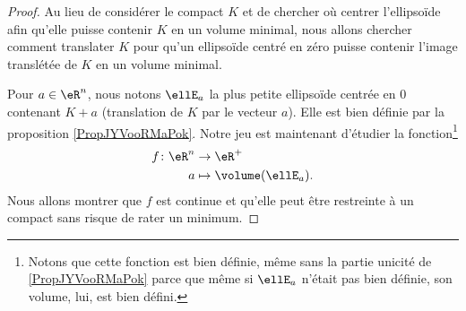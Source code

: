 \begin{proof}
    Au lieu de considérer le compact \( K\) et de chercher où centrer l'ellipsoïde afin qu'elle puisse contenir \( K\) en un volume minimal, nous allons chercher comment translater \( K\) pour qu'un ellipsoïde centré en zéro puisse contenir l'image translétée de \( K \) en un volume minimal.

    Pour \( a\in \eR^n\), nous notons \( \ellE_a\) la plus petite ellipsoïde centrée en \( 0\) contenant \( K+a\) (translation de \( K\) par le vecteur \( a\)). Elle est bien définie par la proposition \ref{PropJYVooRMaPok}. Notre jeu est maintenant d'étudier la fonction\footnote{ Notons que cette fonction est bien définie, même sans la partie unicité de \ref{PropJYVooRMaPok} parce que même si \( \ellE_a\) n'était pas bien définie, son volume, lui, est bien défini.}
    \begin{equation}
        \begin{aligned}
            f\colon \eR^n&\to \eR^+ \\
            a&\mapsto \volume(\ellE_a). 
        \end{aligned}
    \end{equation}
    Nous allons montrer que \( f\) est continue et qu'elle peut être restreinte à un compact sans risque de rater un minimum.


\end{proof}
